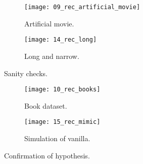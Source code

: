 \begin{figure}
  \centering
  \begin{subfigure}{0.45\textwidth}
    \centering
    \texttt{[image: 09\_rec\_artificial\_movie]}
    \caption{Artificial movie.\label{fig:fig5:a}}
  \end{subfigure}
  \begin{subfigure}{0.45\textwidth}
    \centering
    \texttt{[image: 14\_rec\_long]}
    \caption{Long and narrow.\label{fig:fig5:b}}
  \end{subfigure}
  \caption{Sanity checks.\label{fig:fig5}}
\end{figure}

\begin{figure}
  \centering
  \begin{subfigure}{0.45\textwidth}
    \centering
    \texttt{[image: 10\_rec\_books]}
    \caption{Book dataset.\label{fig:fig6:a}}
  \end{subfigure}
  \begin{subfigure}{0.45\textwidth}
    \centering
    \texttt{[image: 15\_rec\_mimic]}
    \caption{Simulation of vanilla.\label{fig:fig6:b}}
  \end{subfigure}
  \caption{Confirmation of hypothesis.\label{fig:fig6}}
\end{figure}
